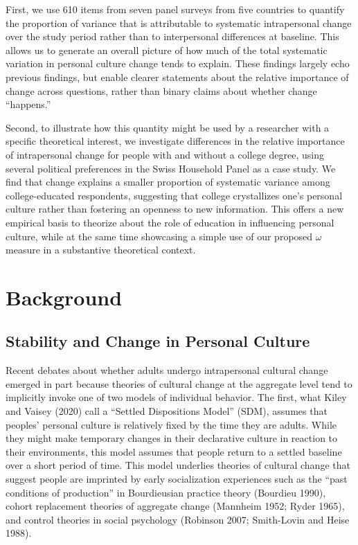 \documentclass[
  11pt,
]{article}
\begin{document}
First, we use 610 items from seven panel surveys from five countries to
quantify the proportion of variance that is attributable to systematic
intrapersonal change over the study period rather than to interpersonal
differences at baseline. This allows us to generate an overall picture
of how much of the total systematic variation in personal culture change
tends to explain. These findings largely echo previous findings, but
enable clearer statements about the relative importance of change across
questions, rather than binary claims about whether change ``happens.''

Second, to illustrate how this quantity might be used by a researcher
with a specific theoretical interest, we investigate differences in the
relative importance of intrapersonal change for people with and without
a college degree, using several political preferences in the Swiss
Household Panel as a case study. We find that change explains a smaller
proportion of systematic variance among college-educated respondents,
suggesting that college crystallizes one's personal culture rather than
fostering an openness to new information. This offers a new empirical
basis to theorize about the role of education in influencing personal
culture, while at the same time showcasing a simple use of our proposed
\(\omega\) measure in a substantive theoretical context.

\section{Background}\label{background}

\subsection{Stability and Change in Personal
Culture}\label{stability-and-change-in-personal-culture}

Recent debates about whether adults undergo intrapersonal cultural
change emerged in part because theories of cultural change at the
aggregate level tend to implicitly invoke one of two models of
individual behavior. The first, what Kiley and Vaisey (2020) call a
``Settled Dispositions Model'' (SDM), assumes that peoples' personal
culture is relatively fixed by the time they are adults. While they
might make temporary changes in their declarative culture in reaction to
their environments, this model assumes that people return to a settled
baseline over a short period of time. This model underlies theories of
cultural change that suggest people are imprinted by early socialization
experiences such as the ``past conditions of production'' in
Bourdieusian practice theory (Bourdieu 1990), cohort replacement
theories of aggregate change (Mannheim 1952; Ryder 1965), and control
theories in social psychology (Robinson 2007; Smith-Lovin and Heise
1988).
\end{document}
